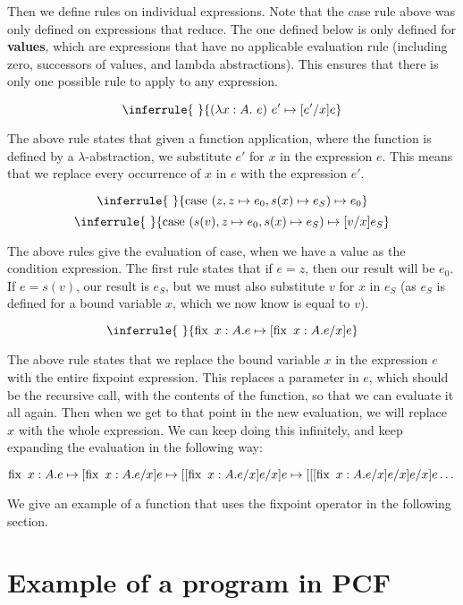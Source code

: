 Then we define rules on individual expressions. Note that the case rule above was only defined on expressions that reduce. The one defined below is only defined for \textbf{values}, which are expressions that have no applicable evaluation rule (including zero, successors of values, and lambda abstractions). This ensures that there is only one possible rule to apply to any expression.



$$
\inferrule{ \ }
 {(\lambda x: A .\ e) \ e' \mapsto [e'/x]e}
$$

The above rule states that given a function application, where the function is defined by a $\lambda$-abstraction, we substitute $e'$ for $x$ in the expression $e$. This means that we replace every occurrence of $x$ in $e$ with the expression $e'$.

$$
\inferrule{ \ }
{\case \ (z, z \mapsto e_0 , s(x) \mapsto e_S) \mapsto e_0}
$$
$$
\inferrule{ \ }
{\case \ (s(v), z \mapsto e_0 , s(x) \mapsto e_S) \mapsto [v/x]e_S}
$$

The above rules give the evaluation of case, when we have a value as the condition expression. The first rule states that if $e = z$, then our result will be $e_0$. If $e = s(v)$, our result is $e_S$, but we must also substitute $v$ for $x$ in $e_S$ (as $e_S$ is defined for a bound variable $x$, which we now know is equal to $v$).

$$
\inferrule{ \ }
{\fix \ x:A. e \mapsto [\fix \ x:A. e/x]e}
$$

The above rule states that we replace the bound variable $x$ in the expression $e$ with the entire fixpoint expression. This replaces a parameter in $e$, which should be the recursive call, with the contents of the function, so that we can evaluate it all again. Then when we get to that point in the new evaluation, we will replace $x$ with the whole expression. We can keep doing this infinitely, and keep expanding the evaluation in the following way:

\[ \operatorname{fix} \ x:A. e \mapsto [\operatorname{fix} \ x:A. e/x]e \mapsto 
[[\operatorname{fix} \ x:A. e/x]e/x]e
\mapsto
[[[\operatorname{fix} \ x:A. e/x]e/x]e/x]e \dots \]

We give an example of a function that uses the fixpoint operator in the following section.

\section{Example of a program in PCF}



